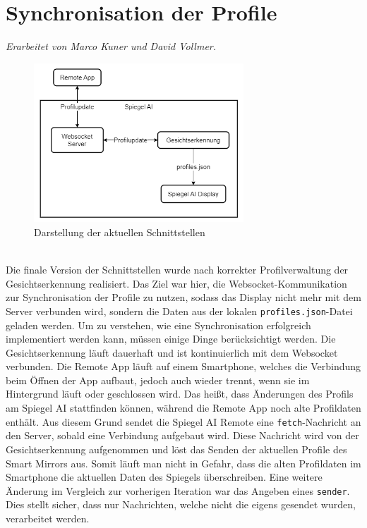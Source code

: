 \section{Synchronisation der Profile}
\textit{Erarbeitet von Marco Kuner und David Vollmer.} \\
\begin{figure}[h]
    \centering
    \includegraphics[width=0.7\textwidth]{pictures/websocket_diagram.png}
    \captionsetup{justification=centering, labelformat=simple, singlelinecheck=false}
    \caption{Darstellung der aktuellen Schnittstellen}
    \label{fig:websocket_diagram}
\end{figure} \\
Die finale Version der Schnittstellen wurde nach korrekter Profilverwaltung der Gesichtserkennung realisiert. Das Ziel war hier, die Websocket-Kommunikation zur Synchronisation der Profile zu nutzen, sodass das Display nicht mehr mit dem Server verbunden wird, sondern die Daten aus der lokalen \texttt{profiles.json}-Datei geladen werden. Um zu verstehen, wie eine Synchronisation erfolgreich implementiert werden kann, müssen einige Dinge berücksichtigt werden. Die Gesichtserkennung läuft dauerhaft und ist kontinuierlich mit dem Websocket verbunden. Die Remote App läuft auf einem Smartphone, welches die Verbindung beim Öffnen der App aufbaut, jedoch auch wieder trennt, wenn sie im Hintergrund läuft oder geschlossen wird. Das heißt, dass Änderungen des Profils am Spiegel AI stattfinden können, während die Remote App noch alte Profildaten enthält. Aus diesem Grund sendet die Spiegel AI Remote eine \texttt{fetch}-Nachricht an den Server, sobald eine Verbindung aufgebaut wird. Diese Nachricht wird von der Gesichtserkennung aufgenommen und löst das Senden der aktuellen Profile des Smart Mirrors aus. Somit läuft man nicht in Gefahr, dass die alten Profildaten im Smartphone die aktuellen Daten des Spiegels überschreiben. Eine weitere Änderung im Vergleich zur vorherigen Iteration war das Angeben eines \texttt{sender}. Dies stellt sicher, dass nur Nachrichten, welche nicht die eigens gesendet wurden, verarbeitet werden.

